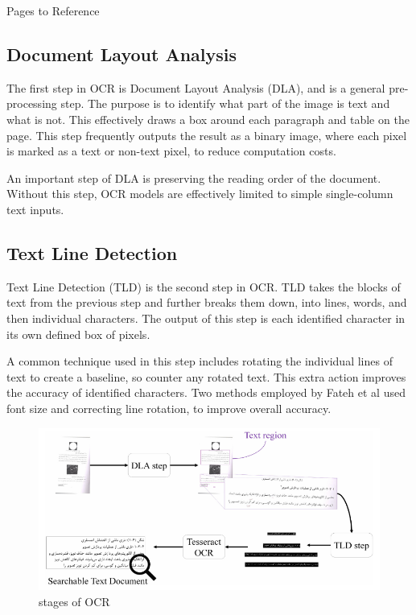 \documentclass[sigplan,screen,nonacm]{acmart-tagged}
\begin{document}
Pages to Reference\cite{Avyodri:2022,Thorat:2022}

\subsection{Document Layout Analysis}
\label{DLA}
The first step in OCR is Document Layout Analysis (DLA), and is a general pre-processing step. The purpose is to identify what part of the image is text and what is not. This effectively draws a box around each paragraph and table on the page.
This step frequently outputs the result as a binary image, where each pixel is marked as a text or non-text pixel, to reduce computation costs.

An important step of DLA is preserving the reading order of the document. Without this step, OCR models are effectively limited to simple single-column text inputs.

\subsection{Text Line Detection}
\label{TLD}
Text Line Detection (TLD) is the second step in OCR. TLD takes the blocks of text from the previous step and further breaks them down, into lines, words, and then individual characters. The output of this step is each identified character in its own defined box of pixels.

A common technique used in this step includes rotating the individual lines of text to create a baseline, so counter any rotated text. This extra action improves the accuracy of identified characters. 
Two methods employed by Fateh et al\citep{Fateh:2024} used font size and correcting line rotation, to improve overall accuracy.


\begin{figure}
  \includegraphics[width=\linewidth]{stages.png}
  \caption{stages of OCR}
  \label{fig:tld}
\end{figure}
\end{document}
